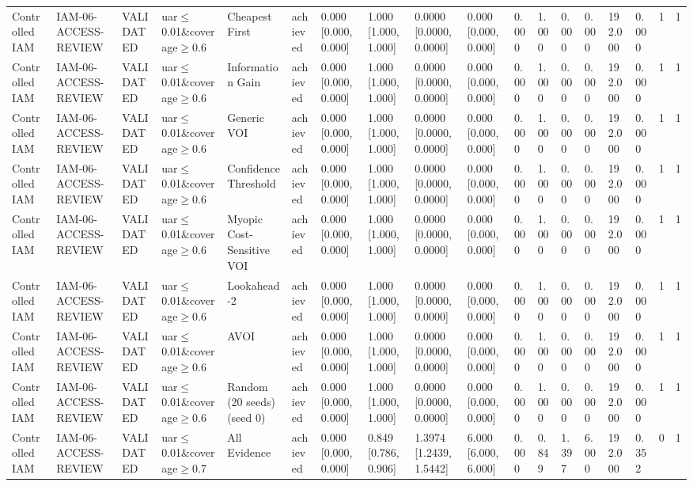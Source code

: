 \begin{table}[!ht]
{\begin{tabular}{llllllllllllllllll}
Controlled IAM & IAM-06-ACCESS-REVIEW & VALIDATED & uar$\le$0.01\&coverage$\ge$0.6 & Cheapest First & achieved & 0.000 [0.000, 0.000] & 1.000 [1.000, 1.000] & 0.0000 [0.0000, 0.0000] & 0.000 [0.000, 0.000] & 0.000 & 1.000 & 0.000 & 0.000 & 192.000 & 0.000 & 1 & 1 \\
Controlled IAM & IAM-06-ACCESS-REVIEW & VALIDATED & uar$\le$0.01\&coverage$\ge$0.6 & Information Gain & achieved & 0.000 [0.000, 0.000] & 1.000 [1.000, 1.000] & 0.0000 [0.0000, 0.0000] & 0.000 [0.000, 0.000] & 0.000 & 1.000 & 0.000 & 0.000 & 192.000 & 0.000 & 1 & 1 \\
Controlled IAM & IAM-06-ACCESS-REVIEW & VALIDATED & uar$\le$0.01\&coverage$\ge$0.6 & Generic VOI & achieved & 0.000 [0.000, 0.000] & 1.000 [1.000, 1.000] & 0.0000 [0.0000, 0.0000] & 0.000 [0.000, 0.000] & 0.000 & 1.000 & 0.000 & 0.000 & 192.000 & 0.000 & 1 & 1 \\
Controlled IAM & IAM-06-ACCESS-REVIEW & VALIDATED & uar$\le$0.01\&coverage$\ge$0.6 & Confidence Threshold & achieved & 0.000 [0.000, 0.000] & 1.000 [1.000, 1.000] & 0.0000 [0.0000, 0.0000] & 0.000 [0.000, 0.000] & 0.000 & 1.000 & 0.000 & 0.000 & 192.000 & 0.000 & 1 & 1 \\
Controlled IAM & IAM-06-ACCESS-REVIEW & VALIDATED & uar$\le$0.01\&coverage$\ge$0.6 & Myopic Cost-Sensitive VOI & achieved & 0.000 [0.000, 0.000] & 1.000 [1.000, 1.000] & 0.0000 [0.0000, 0.0000] & 0.000 [0.000, 0.000] & 0.000 & 1.000 & 0.000 & 0.000 & 192.000 & 0.000 & 1 & 1 \\
Controlled IAM & IAM-06-ACCESS-REVIEW & VALIDATED & uar$\le$0.01\&coverage$\ge$0.6 & Lookahead-2 & achieved & 0.000 [0.000, 0.000] & 1.000 [1.000, 1.000] & 0.0000 [0.0000, 0.0000] & 0.000 [0.000, 0.000] & 0.000 & 1.000 & 0.000 & 0.000 & 192.000 & 0.000 & 1 & 1 \\
Controlled IAM & IAM-06-ACCESS-REVIEW & VALIDATED & uar$\le$0.01\&coverage$\ge$0.6 & AVOI & achieved & 0.000 [0.000, 0.000] & 1.000 [1.000, 1.000] & 0.0000 [0.0000, 0.0000] & 0.000 [0.000, 0.000] & 0.000 & 1.000 & 0.000 & 0.000 & 192.000 & 0.000 & 1 & 1 \\
Controlled IAM & IAM-06-ACCESS-REVIEW & VALIDATED & uar$\le$0.01\&coverage$\ge$0.6 & Random (20 seeds) (seed 0) & achieved & 0.000 [0.000, 0.000] & 1.000 [1.000, 1.000] & 0.0000 [0.0000, 0.0000] & 0.000 [0.000, 0.000] & 0.000 & 1.000 & 0.000 & 0.000 & 192.000 & 0.000 & 1 & 1 \\
Controlled IAM & IAM-06-ACCESS-REVIEW & VALIDATED & uar$\le$0.01\&coverage$\ge$0.7 & All Evidence & achieved & 0.000 [0.000, 0.000] & 0.849 [0.786, 0.906] & 1.3974 [1.2439, 1.5442] & 6.000 [6.000, 6.000] & 0.000 & 0.849 & 1.397 & 6.000 & 192.000 & 0.352 & 0 & 1 \\

\end{tabular}}
\end{table}
